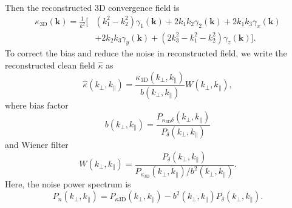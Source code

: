  Then the reconstructed 3D convergence field is
 \begin{equation}
 \label{equ:kappa3D}
 \begin{split}
 \kappa_{3\mathrm{D}}(\mathbf{k})=
 \frac{1}{k^{2}}
 [
&(k_{1}^{2}-k_{2}^{2})\gamma_{1}(\mathbf{k})
 +2k_{1}k_{2}\gamma_{2}(\mathbf{k}) 
 +2k_{1}k_{3}\gamma_{x}(\mathbf{k})\\
&+2k_{2}k_{3}\gamma_{y}(\mathbf{k})
 +(2k_{3}^2-k_1^2-k_2^2)\gamma_{z}(\mathbf{k})
 ].
 \end{split}
 \end{equation}
To correct the bias and reduce the noise in reconstructed field,
 we write the reconstructed clean field $\hat{\kappa}$ as 
\begin{equation}
\label{eq: kappa}
\hat{\kappa}(k_{\perp},k_{\parallel})=\frac{\kappa_{3\mathrm{D}}(k_{\perp},k_{\parallel})}{b(k_{\perp},k_{\parallel})} W(k_{\perp},k_{\parallel}),
\end{equation}
where bias factor 
\begin{equation}
b(k_{\perp},k_{\parallel})=\frac{P_{\kappa_{3\mathrm{D}}\delta}(k_{\perp},k_{\parallel})}{P_{\delta}(k_{\perp},k_{\parallel})}
\label{equ:bias}
\end{equation}
 and Wiener filter 
\begin{equation}
W(k_{\perp},k_{\parallel})=\frac{P_{\delta}(k_{\perp},k_{\parallel})}{P_{\kappa_{3\mathrm{D}}}(k_{\perp},k_{\parallel})/b^{2}(k_{\perp},k_{\parallel})}.
\end{equation}
Here, the noise power spectrum is 
\begin{equation}
P_{n}(k_{\perp},k_{\parallel})=P_{\kappa 3\mathrm{D}}(k_{\perp},k_{\parallel})-b^2(k_{\perp},k_{\parallel})P_{\delta}(k_{\perp},k_{\parallel}).
\end{equation}
